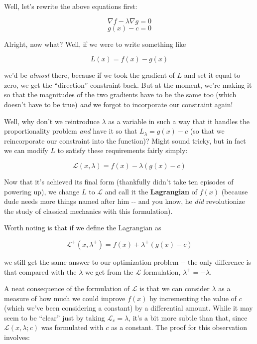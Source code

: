 \documentclass[letterpaper,12pt]{report}
\begin{document}
Well, let's rewrite the above equations first:

\[\nabla f - \lambda \nabla g = 0\] \[g(x) - c = 0\]

Alright, now what? Well, if we were to write something like

\[ L(x) = f(x) - g(x) \]

we'd be \emph{almost} there, because if we took the gradient of \(L\)
and set it equal to zero, we get the ``direction'' constraint back. But at
the moment, we're making it so that the magnitudes of the two gradients
have to be the same too (which doesn't have to be true) \emph{and} we
forgot to incorporate our constraint again!

Well, why don't we reintroduce \(\lambda\) as a variable in such a way
that it handles the proportionality problem \emph{and} have it so that
\(L_{\lambda} = g(x) - c\) (so that we reincorporate our constraint into
the function)? Might sound tricky, but in fact we can modify \(L\) to
satisfy these requirements fairly simply:

\[ \mathcal{L}(x, \lambda) = f(x) - \lambda \left(g(x) - c\right) \]

Now that it's achieved its final form (thankfully didn't take ten
episodes of powering up), we change \(L\) to \(\mathcal{L}\) and call it
the \textbf{Lagrangian} 
of \(f(x)\) (because dude needs more things
named after him -\/- and you know, he \emph{did} revolutionize the study
of classical mechanics with this formulation).

Worth noting is that if we define the Lagrangian as

\[ \mathcal{L^+}(x, \lambda ^+) = f(x) + \lambda^+\left(g(x) - c\right) \]

we still get the same answer to our optimization problem -\/- the only
difference is that compared with the \(\lambda\) we get from the
\(\mathcal{L}\) formulation, \(\lambda ^+ = - \lambda\).

A neat consequence of the formulation of \(\mathcal{L}\) is that we can
consider \(\lambda\) as a measure of how much we could improve \(f(x)\)
by incrementing the value of \(c\) (which we've been considering a
constant) by a differential amount. While it may seem to be ``clear'' just
by taking \(\mathcal{L}_c = \lambda\), it's a bit more subtle than that,
since \(\mathcal{L}(x, \lambda; c)\) was formulated with \(c\) as a
constant. The proof for this observation involves:
\end{document}
